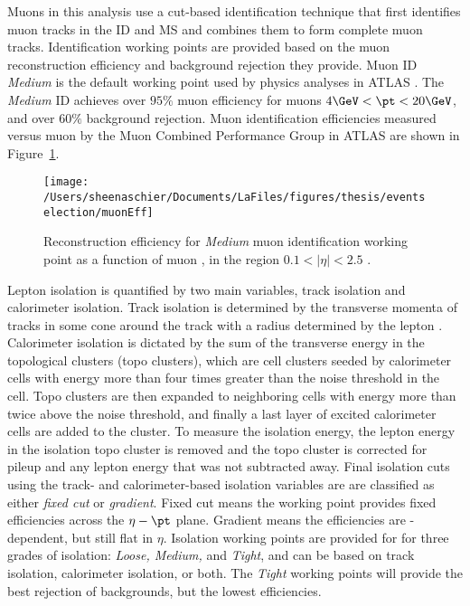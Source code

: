  Muons in this analysis use a cut-based identification technique that first identifies muon tracks in the ID and MS and combines them to form complete muon tracks.  Identification working points are provided based on the muon reconstruction efficiency and background rejection they provide.  Muon ID \textit{Medium} is the default working point used by physics analyses in ATLAS \cite{muonid}.  The \textit{Medium} ID achieves over $95\%$ muon efficiency for muons $4\GeV<\pt<20\GeV$, and over $60\%$ background rejection.  Muon identification efficiencies measured versus muon \pt by the Muon Combined Performance Group in ATLAS are shown in Figure~\ref{fig:emuon}. 
 \begin{figure}[h!]
 \centering
 \texttt{[image: /Users/sheenaschier/Documents/LaFiles/figures/thesis/eventselection/muonEff]}
 \caption{Reconstruction efficiency for \textit{Medium} muon identification working point as a function of muon \pt, in the region $0.1<|\eta|<2.5$ \cite{muon}.}
 \label{fig:emuon}
 \end{figure}
  
Lepton isolation is quantified by two main variables, track isolation and calorimeter isolation.  Track isolation is determined by the transverse momenta of tracks in some cone around the track with a radius determined by the lepton \pt.  Calorimeter isolation is dictated by the sum of the transverse energy in the topological clusters (topo clusters), which are cell clusters seeded by calorimeter cells with energy more than four times greater than the noise threshold in the cell.  Topo clusters are then expanded to neighboring cells with energy more than twice above the noise threshold, and finally a last layer of excited calorimeter cells are added to the cluster.  To measure the isolation energy, the lepton energy in the isolation topo cluster is removed and the topo cluster is corrected for pileup and any lepton energy that was not subtracted away.  Final isolation cuts using the track- and calorimeter-based isolation variables are are classified as either \textit{fixed cut} or \textit{gradient}.  Fixed cut means the working point provides fixed efficiencies across the $\eta-\pt$ plane.  Gradient means the efficiencies are \pt-dependent, but still flat in $\eta$.  Isolation working points are provided for for three grades of isolation: \textit{Loose, Medium,} and \textit{Tight}, and can be based on track isolation, calorimeter isolation, or both.  The \textit{Tight} working points will provide the best rejection of backgrounds, but the lowest efficiencies.
 
